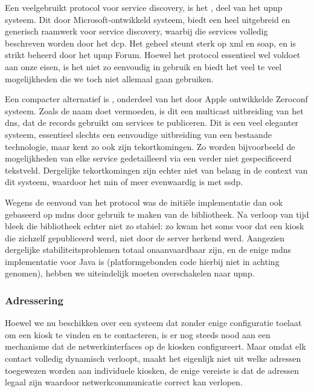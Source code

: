 Een veelgebruikt protocol voor service discovery, is het , deel van het \ac{upnp} systeem. Dit door Microsoft-ontwikkeld systeem, biedt een heel uitgebreid en generisch raamwerk voor service discovery, waarbij die services volledig beschreven worden door het \ac{dcp}. Het geheel steunt sterk op \ac{xml} en \ac{soap}, en is strikt beheerd door het \ac{upnp} Forum. Hoewel het protocol essentieel wel voldoet aan onze eisen, is het niet zo eenvoudig in gebruik en biedt het veel te veel mogelijkheden die we toch niet allemaal gaan gebruiken.

Een compacter alternatief is , onderdeel van het door Apple ontwikkelde Zeroconf systeem. Zoals de naam doet vermoeden, is dit een multicast uitbreiding van het \ac{dns}, dat de  records gebruikt om services te publiceren. Dit is een veel eleganter systeem, essentieel slechts een eenvoudige uitbreiding van een bestaande technologie, maar kent zo ook zijn tekortkomingen. Zo worden bijvoorbeeld de mogelijkheden van elke service gedetailleerd via een verder niet gespecificeerd tekstveld. Dergelijke tekortkomingen zijn echter niet van belang in de context van dit systeem, waardoor het min of meer evenwaardig is met \ac{ssdp}.

Wegens de eenvoud van het protocol was de initiële implementatie dan ook gebaseerd op \ac{mdns} door gebruik te maken van de  bibliotheek. Na verloop van tijd bleek die bibliotheek echter niet zo stabiel: zo kwam het soms voor dat een kiosk die zichzelf gepubliceerd werd, niet door de server herkend werd. Aangezien dergelijke stabiliteitsproblemen totaal onaanvaardbaar zijn, en  de enige \ac{mdns} implementatie voor Java is (platformgebonden code hierbij niet in achting genomen), hebben we uiteindelijk moeten overschakelen naar \ac{upnp}.

\subsubsection{Adressering}

Hoewel we nu beschikken over een systeem dat zonder enige configuratie toelaat om een kiosk te vinden en te contacteren, is er nog steeds nood aan een mechanisme dat de netwerkinterfaces op de kiosken configureert. Maar omdat elk contact volledig dynamisch verloopt, maakt het eigenlijk niet uit welke adressen toegewezen worden aan individuele kiosken, de enige vereiste is dat de adressen legaal zijn waardoor netwerkcommunicatie correct kan verlopen.

